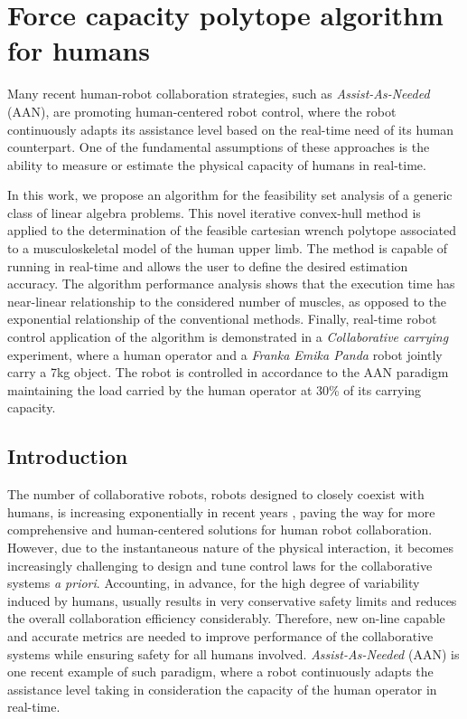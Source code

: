 

\chapter{Force capacity polytope algorithm for humans}

Many recent human-robot collaboration strategies, such as \textit{Assist-As-Needed} (AAN), are promoting human-centered robot control, where the robot continuously adapts its assistance level based on the real-time need of its human counterpart.
One of the fundamental assumptions of these approaches is the ability to measure or estimate the physical capacity of humans in real-time.

In this work, we propose an algorithm for the feasibility set analysis of a generic class of linear algebra problems. This novel iterative convex-hull method is applied to the determination of the feasible cartesian wrench polytope associated to a musculoskeletal model of the human upper limb. The method is capable of running in real-time and allows the user to define the desired estimation accuracy.  
The algorithm performance analysis shows that the execution time has near-linear relationship to the considered number of muscles, as opposed to the exponential relationship of the conventional methods. Finally, real-time robot control application of the algorithm is demonstrated in a \textit{Collaborative carrying} experiment, where a human operator and a \textit{Franka Emika Panda} robot jointly carry a 7kg object. The robot is controlled in accordance to the AAN paradigm maintaining the load carried by the human operator at 30\% of its carrying capacity.

\section{Introduction}

The number of collaborative robots, robots designed to closely coexist with humans, is increasing exponentially in recent years \cite{ajoudani2018progress}, paving the way for more comprehensive and human-centered solutions for human robot collaboration. However, due to the instantaneous nature of the physical interaction, it becomes increasingly challenging to design and tune control laws for the collaborative systems \textit{a priori}. Accounting, in advance, for the high degree of variability induced by humans, usually results in very conservative safety limits and reduces the overall collaboration efficiency considerably. Therefore, new on-line capable and accurate metrics are needed to improve performance of the collaborative systems while ensuring safety for all humans involved. \textit{Assist-As-Needed} (AAN)\cite{carmichael2013admittance} is one recent example of such paradigm, where a robot continuously adapts the assistance level taking in consideration the capacity of the human operator in real-time.

